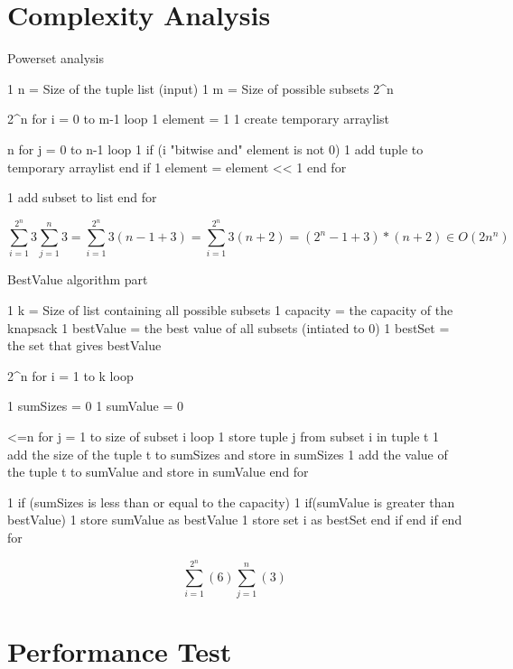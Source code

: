 \documentclass{inc/mas}
\begin{document}
\section{Complexity Analysis}

Powerset analysis \\

\begin{verbatimtab}[4]
1		n = Size of the tuple list (input)
1		m = Size of possible subsets 2^n


2^n		for i = 0 to m-1 loop	
1			element = 1	
1			create temporary arraylist
	  
n			for j = 0 to n-1 loop	
1				if (i "bitwise and" element is not 0)
1					add tuple to temporary arraylist
				end if
1				element = element << 1
			end for
	
1		add subset to list
		end for
\end{verbatimtab}

\begin{equation}
\sum^{2^n}_{i =1}3\sum^n_{j=1}3= 
\sum^{2^n}_{i =1}3(n-1+3) = 
\sum^{2^n}_{i =1}3(n+2) = 
(2^n-1+3)*(n+2) \in O(2n^n)
\end{equation}


BestValue algorithm part\\

\begin{verbatimtab}[4]
1		k = Size of list containing all possible subsets
1		capacity = the capacity of the knapsack
1		bestValue = the best value of all subsets (intiated to 0)
1		bestSet = the set that gives bestValue

2^n		for i = 1 to k loop

1			sumSizes = 0
1			sumValue = 0

<=n			for j = 1 to size of subset i loop
1				store tuple j from subset i in tuple t
1				add the size of the tuple t to sumSizes and store in sumSizes
1				add the value of the tuple t to sumValue and store in sumValue
			end for

1			if (sumSizes is less than or equal to the capacity)
1				if(sumValue is greater than bestValue)
1					store sumValue as bestValue
1					store set i as bestSet
				end if
			end if
		end for
\end{verbatimtab}


\begin{equation}
\sum^{2^n}_{i=1}(6)\sum^n_{j=1}(3)
\end{equation}


\section{Performance Test}
\end{document}
